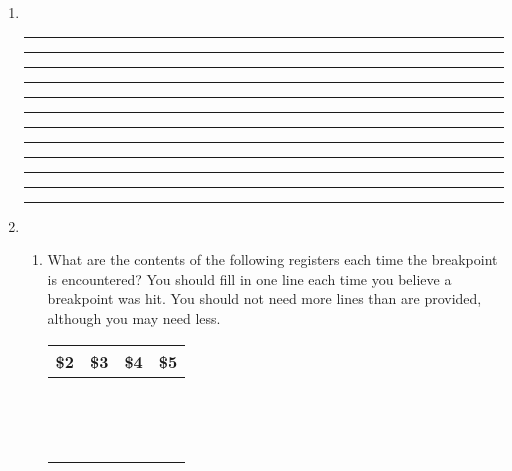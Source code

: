 \documentclass[a4paper,10pt]{article}
\begin{document}
\begin{enumerate}
\vspace{7mm}\hrule\vspace{7mm}\hrule\vspace{7mm}\hrule\vspace{7mm}\hrule\vspace{7mm}\hrule
\vspace{7mm}\hrule\vspace{7mm}\hrule\vspace{7mm}\hrule\vspace{3mm}
\item~

\vspace{7mm}\hrule\vspace{7mm}\hrule\vspace{7mm}\hrule\vspace{7mm}\hrule\vspace{7mm}\hrule
\vspace{7mm}\hrule\vspace{7mm}\hrule\vspace{7mm}\hrule\vspace{7mm}\hrule
\vspace{7mm}\hrule\vspace{7mm}\hrule\vspace{7mm}\hrule\vspace{3mm}

\newpage
\item

\begin{enumerate}
 \item What are the contents of the following registers each time the
breakpoint is encountered? You should fill in one line each time you
believe a breakpoint was hit. You should not need more lines than are
provided, although you may need less.

\begin{center}
\begin{tabular}{|c|c|c|c|}
\hline\hspace{8mm}\textbf{\$2}\hspace{8mm} & \hspace{8mm}\textbf{\$3}\hspace{8mm} & \hspace{8mm}\textbf{\$4}\hspace{8mm} & \hspace{8mm}\textbf{\$5}\hspace{8mm} \\
\hline & & & \\ & & & \\
\hline & & & \\ & & & \\
\hline & & & \\ & & & \\
\hline & & & \\ & & & \\
\hline & & & \\ & & & \\
\hline & & & \\ & & & \\
\hline & & & \\ & & & \\
\hline


\end{tabular}
\end{center}
\end{enumerate}
\end{enumerate}
\end{document}
